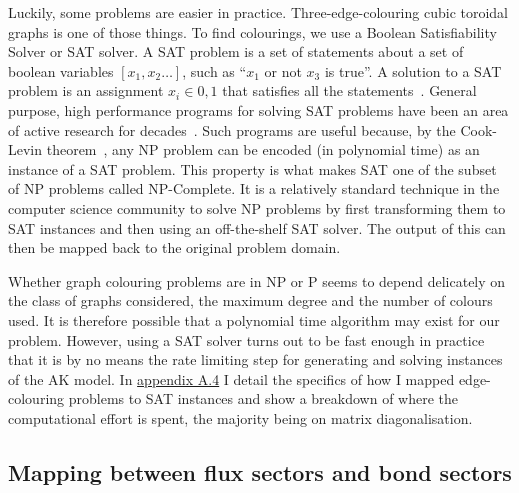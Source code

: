 Luckily, some problems are easier in practice. Three-edge-colouring cubic toroidal graphs is one of those things. To find colourings, we use a Boolean Satisfiability Solver or SAT solver. A SAT problem is a set of statements about a set of boolean variables \([x_1, x_2\ldots]\), such as ``\(x_1\) or not \(x_3\) is true''. A solution to a SAT problem is an assignment \(x_i \in {0,1}\) that satisfies all the statements~\autocite{Karp1972}. General purpose, high performance programs for solving SAT problems have been an area of active research for decades~\autocite{alounehComprehensiveStudyAnalysis2019}. Such programs are useful because, by the Cook-Levin theorem~\autocite{cookComplexityTheoremprovingProcedures1971,levin1973universal}, any NP problem can be encoded (in polynomial time) as an instance of a SAT problem. This property is what makes SAT one of the subset of NP problems called NP-Complete. It is a relatively standard technique in the computer science community to solve NP problems by first transforming them to SAT instances and then using an off-the-shelf SAT solver. The output of this can then be mapped back to the original problem domain.

Whether graph colouring problems are in NP or P seems to depend delicately on the class of graphs considered, the maximum degree and the number of colours used. It is therefore possible that a polynomial time algorithm may exist for our problem. However, using a SAT solver turns out to be fast enough in practice that it is by no means the rate limiting step for generating and solving instances of the AK model. In \protect\hyperlink{app-lattice-generation}{appendix A.4} I detail the specifics of how I mapped edge-colouring problems to SAT instances and show a breakdown of where the computational effort is spent, the majority being on matrix diagonalisation.

\hypertarget{mapping-between-flux-sectors-and-bond-sectors}{%
\subsection{Mapping between flux sectors and bond sectors}\label{mapping-between-flux-sectors-and-bond-sectors}}

